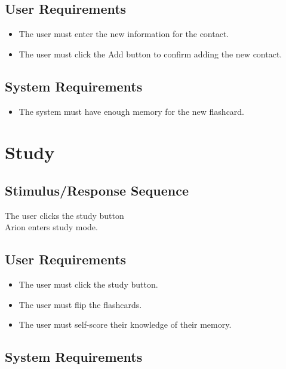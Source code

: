 \documentclass{scrreprt}
\begin{document}
    \subsection*{User Requirements}
        \begin{itemize}
            \item The user must enter the new information for the contact.
            \item The user must click the Add button to confirm adding the new contact.
        \end{itemize}

    \subsection*{System Requirements}
        \begin{itemize}
            \item The system must have enough memory for the new flashcard.
        \end{itemize}

\section{Study}
    \subsection*{Stimulus/Response Sequence}
        \begin{flushleft}
             The user clicks the study button  \\
             Arion enters study mode. \\
        \end{flushleft}

    \subsection*{User Requirements}
        \begin{itemize}
            \item The user must click the study button.
            \item The user must flip the flashcards.
            \item The user must self-score their knowledge of their memory.
        \end{itemize}

    \subsection*{System Requirements}
\end{document}
